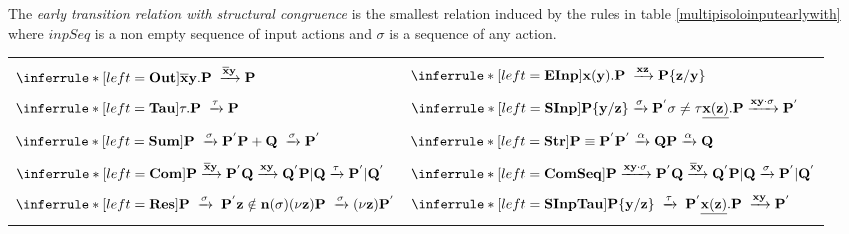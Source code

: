 \begin{definition}
  The \emph{early transition relation with structural congruence} is the smallest relation induced by the rules in table \ref{multipisoloinputearlywith} where $inpSeq$ is a non empty sequence of input actions and $\sigma$ is a sequence of any action.
  \begin{table}
    \begin{tabular}{ll}
	  \hline\\
	  $\inferrule* [left=\bf{Out}]{
	  }{
	    \overline{x}y.P \;\xrightarrow{\overline{x}y} P
	  }$
	&
	  $\inferrule* [left=\bf{EInp}]{
	  }{
	    x(y).P \;\xrightarrow{xz} P\{z/y\}
	  }$
      \\\\
	  $\inferrule* [left=\bf{Tau}]{
	  }{
	    \tau.P \;\xrightarrow{\tau} P
	  }$
	&
	  $\inferrule* [left=\bf{SInp}]{
	      P\{y/z\} \xrightarrow{\sigma} P^{'}
	    \\
	      \sigma\neq \tau
	  }{
	    \underline{x(z)}.P \xrightarrow{xy \cdot \sigma} P^{'}
	  }$
      \\\\
	  $\inferrule* [left=\bf{Sum}]{
	    P \;\xrightarrow{\sigma} P^{'}
	  }{
	    P+Q \;\xrightarrow{\sigma} P^{'}
	  }$
	&
	  $\inferrule* [left=\bf{Str}]{
	      P\equiv P^{'}
	    \\
	      P^{'} \xrightarrow{\alpha} Q
	  }{
	      P \xrightarrow{\alpha} Q
	  }$
      \\\\
	  $\inferrule* [left=\bf{Com}]{
	      P \xrightarrow{\overline{x}y} P^{'}
	    \\
	      Q \xrightarrow{xy} Q^{'}
	  }{
	    P|Q \xrightarrow{\tau} P^{'}|Q^{'}
	  }$
	&
	  $\inferrule* [left=\bf{ComSeq}]{
	      P \xrightarrow{xy\cdot \sigma} P^{'}
	    \\
	      Q \xrightarrow{\overline{x}y} Q^{'}
	  }{
	    P|Q \xrightarrow{\sigma} P^{'}|Q^{'}
	  }$
      \\\\
	  $\inferrule* [left=\bf{Res}]{
	      P\; \xrightarrow{\sigma}\; P^{'}
	    \\
	      z\notin n(\sigma)
	  }{
	    (\nu z) P \;\xrightarrow{\sigma} (\nu z) P^{'}
	  }$
	&
	  $\inferrule* [left=\bf{SInpTau}]{
	      P\{y/z\}\; \xrightarrow{\tau}\; P^{'}
	  }{
	    \underline{x(z)}.P \;\xrightarrow{xy} P^{'}
	  }$
      \\\\

\end{tabular}
\end{table}
\end{definition}
